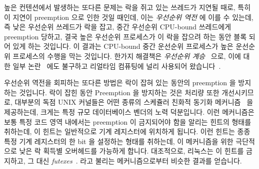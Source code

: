 \fi

높은 컨텐션에서 발생하는 또다른 문제는 락을 쥐고 있는 쓰레드가 지연될 때로,
특히 이 지연이 preemption 으로 인한 것일 때인데, 이는 \emph{우선순위 역전} 에
이를 수 있는데, 즉 낮은 우선순위 쓰레드가 락을 잡고, 중간 우선순위 CPU-bound
쓰레드에게 preemption 당하고, 결국 높은 우선순위 프로세스가 이 락을 잡으려 하는
동안 블록 되어 있게 하는 것입니다.
이 결과는 CPU-bound 중간 운선순위 프로세스가 높은 운선순위 프로세스의 수행을
막는 것입니다.
한가지 해결책은 \emph{우선순위 계승}~\cite{Lampson1980Mesa} 으로, 이에 대한
일부 논란~\cite{Yodaiken2004FSM,DougLocke2002a} 에도 불구하고 리얼타임 컴퓨팅에
널리 사용되어
왔습니다~\cite{LuiSha1990PriorityInheritance,JonathanCorbet2006PriorityInheritance}.

우선순위 역전을 회피하는 또다른 방법은 락이 잡혀 있는 동안의 preemption 을
방지하는 것입니다.
락이 잡힌 동안 Preemption 을 방지하는 것은 처리량 또한 개선시키므로, 대부분의
독점 UNIX 커널들은 어떤 종류의 스케쥴러 친화적 동기화
메커니즘~\cite{Kontothanassis97a} 을 제공하는데, 크게는 특정 규모 데이터베이스
벤더의 노력 덕분입니다.
이런 메커니즘은 보통 특정 코드 영역 내에서는 preemption 이 금지되어야 함을
알리는 힌트의 형태를 취하는데, 이 힌트는 일반적으로 기계 레지스터에 위치하게
됩니다.
이런 힌트는 종종 특정 기계 레지스터의 한 bit 을 설정하는 형태를 취하는데, 이
메커니즘을 위한 극단적으로 낮은 락 획득별 오버헤드를 가능하게 합니다.
대조적으로, 리눅스는 이 힌트를 금지하고, 그 대신
\emph{futexes}~\cite{HubertusFrancke2002Futex,IngoMolnar2006RobustFutexes,StevenRostedt2006piFutexes,UlrichDrepper2011Futexes}.
라고 불리는 메커니즘으로부터 비슷한 결과를 얻습니다.

\iffalse

